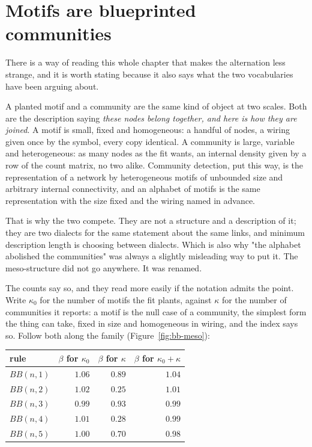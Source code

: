 \section{Motifs are blueprinted communities}
\label{sec:bb-meso}

There is a way of reading this whole chapter that makes the alternation less
strange, and it is worth stating because it also says what the two vocabularies
have been arguing about.

A planted motif and a community are the same kind of object at two scales. Both
are the description saying \emph{these nodes belong together, and here is how
they are joined}. A motif is small, fixed and homogeneous: a handful of nodes, a
wiring given once by the symbol, every copy identical. A community is large,
variable and heterogeneous: as many nodes as the fit wants, an internal density
given by a row of the count matrix, no two alike. Community detection, put this
way, is the representation of a network by heterogeneous motifs of unbounded size
and arbitrary internal connectivity, and an alphabet of motifs is the same
representation with the size fixed and the wiring named in advance.

That is why the two compete. They are not a structure and a description of it;
they are two dialects for the same statement about the same links, and minimum
description length is choosing between dialects. Which is also why "the alphabet
abolished the communities" was always a slightly misleading way to put it. The
meso-structure did not go anywhere. It was renamed.

The counts say so, and they read more easily if the notation admits the point.
Write $\kappa_0$ for the number of motifs the fit plants, against $\kappa$ for the
number of communities it reports: a motif is the null case of a community, the
simplest form the thing can take, fixed in size and homogeneous in wiring, and
the index says so. Follow both along the family (Figure~\ref{fig:bb-meso}):

\begin{center}
\footnotesize
\begin{tabular}{lrrr}
\hline
rule & $\beta$ for $\kappa_0$ & $\beta$ for $\kappa$ & $\beta$ for $\kappa_0+\kappa$\\
\hline
$BB(n,1)$ & $1.06$ & $0.89$ & $1.04$\\
$BB(n,2)$ & $1.02$ & $\mathbf{0.25}$ & $1.01$\\
$BB(n,3)$ & $0.99$ & $0.93$ & $0.99$\\
$BB(n,4)$ & $1.01$ & $\mathbf{0.28}$ & $0.99$\\
$BB(n,5)$ & $1.00$ & $0.70$ & $0.98$\\
\hline
\end{tabular}
\end{center}


